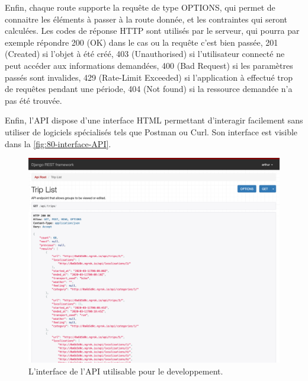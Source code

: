 Enfin, chaque route supporte la requête de type OPTIONS, qui permet de connaitre les éléments à passer à la route donnée, et les contraintes qui seront calculées.
Les codes de réponse HTTP sont utilisés par le serveur, qui pourra par exemple répondre 200 (OK) dans le cas ou la requête c'est bien passée, 201 (Created) si l'objet à été créé, 403 (Unauthorised) si l'utilisateur connecté ne peut accéder aux informations demandées, 400 (Bad Request) si les paramètres passés sont invalides, 429 (Rate-Limit Exceeded) si l'application à effectué trop de requêtes pendant une période, 404 (Not found) si la ressource demandée n'a pas été trouvée.

Enfin, l'API dispose d'une interface HTML permettant d'interagir facilement sans utiliser de logiciels spécialisés tels que Postman ou Curl. Son interface est visible dans la \autoref{fig:80-interface-API}.

\begin{figure}[h]
    \centering
    \includegraphics[keepaspectratio, width=2\textwidth/2, height=2\textheight/5]{ima/interface-api}
    \caption{L'interface de l'API utilisable pour le developpement.}
    \label{fig:80-interface-API}
\end{figure}
